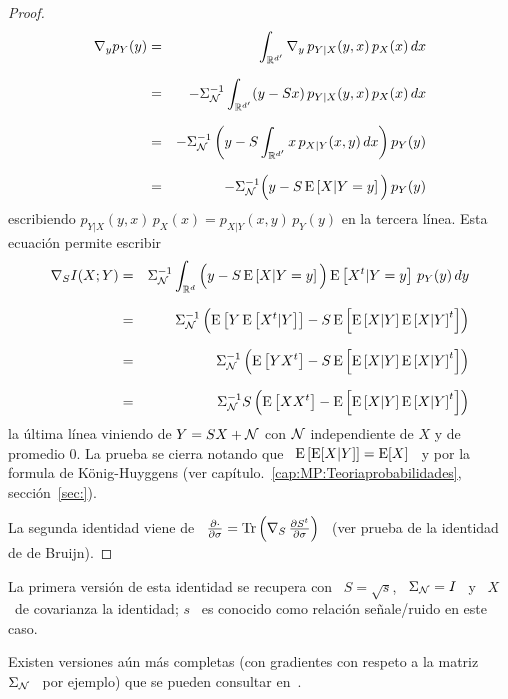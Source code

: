 \begin{proof}
  \begin{eqnarray*}
  \nabla_y p_Y(y) & = & \int_{\mathbb{R}^{d'}} \nabla_y \, p_{Y|X}(y,x) \, p_X(x) \,
  dx\\[2.5mm]
  & = & - \Sigma_{\mathcal{N}}^{-1} \int_{\mathbb{R}^{d'}} (y - S x) \, p_{Y|X}(y,x) \, p_X(x) \,
  dx\\[2.5mm]
  & = & - \Sigma_{\mathcal{N}}^{-1} \left( y - S \int_{\mathbb{R}^{d'}} x \, p_{X|Y}(x,y) \,dx
  \right) p_Y(y)\\[2.5mm]
  & = & - \Sigma_{\mathcal{N}}^{-1} \Big( y - S \operatorname{E}\left[X | Y=y \right] \Big) \, p_Y(y)
  \end{eqnarray*}
  escribiendo $p_{Y|X}(y,x)  \, p_X(x) =  p_{X|Y}(x,y) \, p_Y(y)$ en  la tercera
  l\'inea. Esta ecuaci\'on permite escribir
  \begin{eqnarray*}
  \nabla_S I(X;Y) & = & \Sigma_{\mathcal{N}}^{-1} \int_{\mathbb{R}^d} \Big( y - S \operatorname{E}\left[X |
  Y=y \right] \Big) \operatorname{E}\left[X^t | Y=y \right] \, p_Y(y) \, dy\\[2.5mm]
  & = & \Sigma_{\mathcal{N}}^{-1} \left( \operatorname{E}\left[ Y \operatorname{E}\left[ X^t|Y \right] \right] - S
  \operatorname{E}\left[ \operatorname{E}\left[X | Y \right] \operatorname{E}\left[X | Y \right]^t \right]
  \right)\\[2.5mm]
  & = & \Sigma_{\mathcal{N}}^{-1} \left( \operatorname{E}\left[ Y X^t \right] - S \operatorname{E}\left[
  \operatorname{E}\left[X | Y \right] \operatorname{E}\left[X | Y \right]^t \right] \right)\\[2.5mm]
  & = & \Sigma_{\mathcal{N}}^{-1} S \left( \operatorname{E}\left[ X X^t \right] - \operatorname{E}\left[
  \operatorname{E}\left[X | Y \right] \operatorname{E}\left[X | Y \right]^t \right] \right)
  \end{eqnarray*}
  la \'ultima l\'inea viniendo de $Y  = S X + \mathcal{N}$ con $\mathcal{N}$ independiente
  de  $X$ y  de  promedio 0.   La prueba  se  cierra notando  que \  $\operatorname{E}\left[
    \operatorname{E}[X|Y] \right]  = \operatorname{E}[X]$  \ y por  la formula de  K\"onig-Huyggens (ver
  cap\'itulo.~\ref{cap:MP:Teoriaprobabilidades}, secci\'on~\ref{sec:}).

  La  segunda identidad  viene de  \ $\frac{\partial  \cdot}{\partial  \sigma} =
  \operatorname{Tr}\left(  \nabla_S \,  \frac{\partial S^t}{\partial  \sigma} \right)$  \ (ver
  prueba de la identidad de de Bruijn).
\end{proof}
%
\noindent  La  primera versi\'on  de  esta  identidad se  recupera  con  \ $S  =
\sqrt{s}$, \ $\Sigma_{\mathcal{N}} =  I$ \ y \ $X$ \ de  covarianza la identidad; $s$ \
es conocido como relaci\'on se\~nale/ruido en este caso.

Existen versiones a\'un m\'as completas  (con gradientes con respeto a la matriz
\  $\Sigma_{\mathcal{N}}$  \  por  ejemplo)  que se  pueden  consultar  en~\cite{Joh04,
  PalVer06, PayPal09}.

